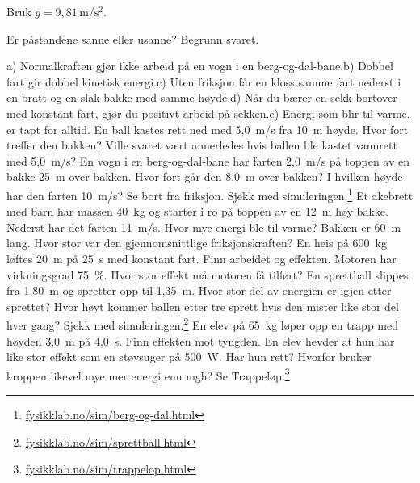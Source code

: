 \documentclass[11pt]{article}
\begin{document}
Bruk $g = 9{,}81\,\mathrm{m/s^{2}}$.

\begin{oppgaveliste}
\oppgave {}Er påstandene sanne eller usanne? Begrunn svaret.

a) Normalkraften gjør ikke arbeid på en vogn i en berg-og-dal-bane.\newline b) Dobbel fart gir dobbel kinetisk energi.\newline c) Uten friksjon får en kloss samme fart nederst i en bratt og en slak bakke med samme høyde.\newline d) Når du bærer en sekk bortover med konstant fart, gjør du positivt arbeid på sekken.\newline e) Energi som blir til varme, er tapt for alltid.
\svar
\oppgave {}En ball kastes rett ned med 5,0~m/s fra 10~m høyde. Hvor fort treffer den bakken? Ville svaret vært annerledes hvis ballen ble kastet vannrett med 5,0~m/s?
\svar
\oppgave {}En vogn i en berg-og-dal-bane har farten 2,0~m/s på toppen av en bakke 25~m over bakken. Hvor fort går den 8,0~m over bakken? I hvilken høyde har den farten 10~m/s? Se bort fra friksjon. Sjekk med simuleringen.\footnote{\url{fysikklab.no/sim/berg-og-dal.html}}
\svar
\oppgave {}Et akebrett med barn har massen 40~kg og starter i ro på toppen av en 12~m høy bakke. Nederst har det farten 11~m/s. Hvor mye energi ble til varme? Bakken er 60~m lang. Hvor stor var den gjennomsnittlige friksjonskraften?
\svar
\oppgave {}En heis på 600~kg løftes 20~m på 25~s med konstant fart. Finn arbeidet og effekten. Motoren har virkningsgrad 75~\%. Hvor stor effekt må motoren få tilført?
\svar
\oppgave {}En sprettball slippes fra 1,80~m og spretter opp til 1,35~m. Hvor stor del av energien er igjen etter sprettet? Hvor høyt kommer ballen etter tre sprett hvis den mister like stor del hver gang? Sjekk med simuleringen.\footnote{\url{fysikklab.no/sim/sprettball.html}}
\svar
\oppgave {}En elev på 65~kg løper opp en trapp med høyden 3,0~m på 4,0~s. Finn effekten mot tyngden. En elev hevder at hun har like stor effekt som en støvsuger på 500~W. Har hun rett? Hvorfor bruker kroppen likevel mye mer energi enn mgh? Se Trappeløp.\footnote{\url{fysikklab.no/sim/trappelop.html}}
\svar
\end{oppgaveliste}
\end{document}
